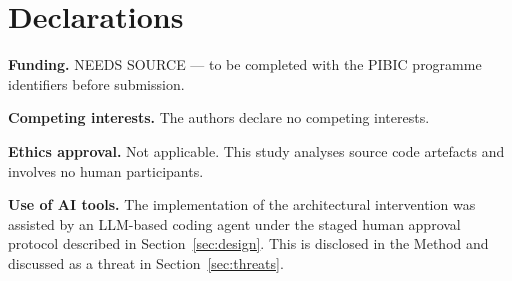 \documentclass{sbc2019}%
\begin{document}
\section*{Declarations}

\noindent\textbf{Funding.} NEEDS SOURCE --- to be completed with the PIBIC
programme identifiers before submission.

\noindent\textbf{Competing interests.} The authors declare no competing
interests.

\noindent\textbf{Ethics approval.} Not applicable. This study analyses source
code artefacts and involves no human participants.

\noindent\textbf{Use of AI tools.} The implementation of the architectural
intervention was assisted by an LLM-based coding agent under the staged human
approval protocol described in Section~\ref{sec:design}. This is disclosed in the
Method and discussed as a threat in Section~\ref{sec:threats}.



\end{document}
